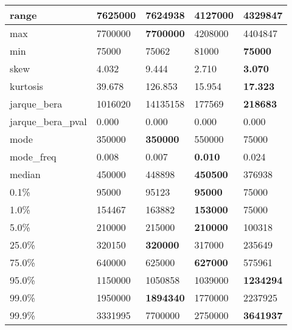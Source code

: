 \begin{table}[H]
\begin{tabular}{|l|m{10em}|m{10em}|m{10em}|m{10em}|}
\hline range & 7625000 & \bfseries 7624938 & \cellcolor[rgb]{0.9, 0.54, 0.52} 4127000 & 4329847 \\
\hline max & 7700000 & \bfseries 7700000 & \cellcolor[rgb]{0.9, 0.54, 0.52} 4208000 & 4404847 \\
\hline min & 75000 & 75062 & \cellcolor[rgb]{0.9, 0.54, 0.52} 81000 & \bfseries 75000 \\
\hline skew & 4.032 & \cellcolor[rgb]{0.9, 0.54, 0.52} 9.444 & 2.710 & \bfseries 3.070 \\
\hline kurtosis & 39.678 & \cellcolor[rgb]{0.9, 0.54, 0.52} 126.853 & 15.954 & \bfseries 17.323 \\
\hline jarque\_bera & 1016020 & \cellcolor[rgb]{0.9, 0.54, 0.52} 14135158 & 177569 & \bfseries 218683 \\
\hline jarque\_bera\_pval & 0.000 & 0.000 & 0.000 & 0.000 \\
\hline mode & 350000 & \bfseries 350000 & 550000 & \cellcolor[rgb]{0.9, 0.54, 0.52} 75000 \\
\hline mode\_freq & 0.008 & 0.007 & \bfseries 0.010 & \cellcolor[rgb]{0.9, 0.54, 0.52} 0.024 \\
\hline median & 450000 & 448898 & \bfseries 450500 & \cellcolor[rgb]{0.9, 0.54, 0.52} 376938 \\
\hline 0.1\% & 95000 & 95123 & \bfseries 95000 & \cellcolor[rgb]{0.9, 0.54, 0.52} 75000 \\
\hline 1.0\% & 154467 & 163882 & \bfseries 153000 & \cellcolor[rgb]{0.9, 0.54, 0.52} 75000 \\
\hline 5.0\% & 210000 & 215000 & \bfseries 210000 & \cellcolor[rgb]{0.9, 0.54, 0.52} 100318 \\
\hline 25.0\% & 320150 & \bfseries 320000 & 317000 & \cellcolor[rgb]{0.9, 0.54, 0.52} 235649 \\
\hline 75.0\% & 640000 & 625000 & \bfseries 627000 & \cellcolor[rgb]{0.9, 0.54, 0.52} 575961 \\
\hline 95.0\% & 1150000 & 1050858 & \cellcolor[rgb]{0.9, 0.54, 0.52} 1039000 & \bfseries 1234294 \\
\hline 99.0\% & 1950000 & \bfseries 1894340 & 1770000 & \cellcolor[rgb]{0.9, 0.54, 0.52} 2237925 \\
\hline 99.9\% & 3331995 & \cellcolor[rgb]{0.9, 0.54, 0.52} 7700000 & 2750000 & \bfseries 3641937 \\
\hline
\end{tabular}
\end{table}
